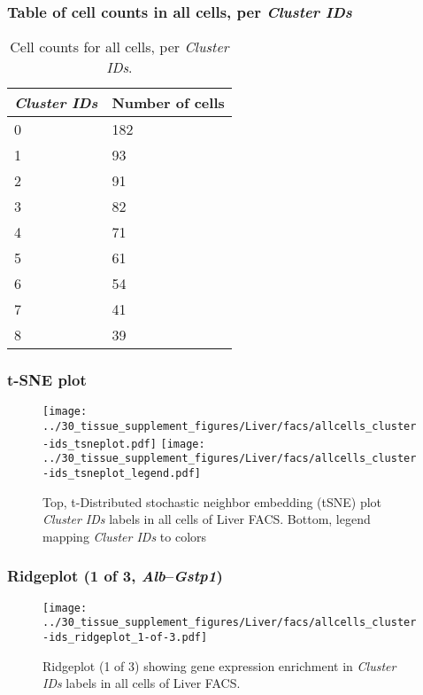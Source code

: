 \subsubsection{Table of cell counts in all cells, per \emph{Cluster IDs}}\begin{table}[h]
\centering
\label{my-label}
\begin{tabular}{@{}ll@{}}
\toprule

\emph{Cluster IDs}& Number of cells \\ \midrule
0 & 182 \\

1 & 93 \\

2 & 91 \\

3 & 82 \\

4 & 71 \\

5 & 61 \\

6 & 54 \\

7 & 41 \\

8 & 39 \\
\bottomrule
\end{tabular}
\caption{Cell counts for all cells, per \emph{Cluster IDs}.}
\end{table}

\clearpage
\subsubsection{t-SNE plot}
\begin{figure}[h]
\centering
\texttt{[image: ../30\_tissue\_supplement\_figures/Liver/facs/allcells\_cluster-ids\_tsneplot.pdf]}
\texttt{[image: ../30\_tissue\_supplement\_figures/Liver/facs/allcells\_cluster-ids\_tsneplot\_legend.pdf]}
\caption{Top, t-Distributed stochastic neighbor embedding (tSNE) plot  \emph{Cluster IDs} labels in all cells of Liver FACS. Bottom, legend mapping \emph{Cluster IDs} to colors}
\end{figure}


\clearpage

\subsubsection{Ridgeplot (1 of 3, \emph{Alb}--\emph{Gstp1})}
\begin{figure}[h]
\centering
\texttt{[image: ../30\_tissue\_supplement\_figures/Liver/facs/allcells\_cluster-ids\_ridgeplot\_1-of-3.pdf]}

\caption{ Ridgeplot (1 of 3)  showing gene expression enrichment in \emph{Cluster IDs} labels in all cells of Liver FACS. }
\end{figure}


